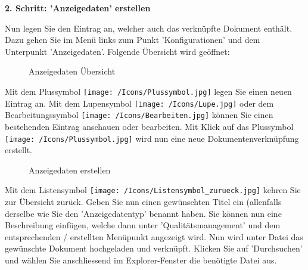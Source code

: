 \vspace{\baselineskip}

\textbf{2. Schritt: 'Anzeigedaten' erstellen}

Nun legen Sie den Eintrag an, welcher auch das verknüpfte Dokument enthält. Dazu gehen Sie im Menü links zum Punkt 'Konfigurationen' und dem Unterpunkt 'Anzeigedaten'. Folgende Übersicht wird geöffnet: 

\begin{figure}[H]
\caption{Anzeigedaten Übersicht}
\end{figure}

Mit dem Plussymbol \texttt{[image: /Icons/Plussymbol.jpg]}  legen Sie einen neuen Eintrag an. Mit dem Lupensymbol \texttt{[image: /Icons/Lupe.jpg]}  oder dem Bearbeitungssymbol \texttt{[image: /Icons/Bearbeiten.jpg]}  können Sie einen bestehenden Eintrag anschauen oder bearbeiten. Mit Klick auf das Plussymbol \texttt{[image: /Icons/Plussymbol.jpg]}  wird nun eine neue Dokumentenverknüpfung erstellt. 

\begin{figure}[H]
\caption{Anzeigedaten erstellen}
\end{figure}

Mit dem Listensymbol \texttt{[image: /Icons/Listensymbol\_zurueck.jpg]}  kehren Sie zur Übersicht zurück. Geben Sie nun einen gewünschten Titel  ein (allenfalls derselbe wie Sie den 'Anzeigedatentyp' benannt haben. Sie können nun eine Beschreibung  einfügen, welche dann unter 'Qualitätsmanagement' und dem entsprechenden / erstellten Menüpunkt angezeigt wird. Nun wird unter Datei  das gewünschte Dokument hochgeladen und verknüpft. Klicken Sie auf 'Durchsuchen' und wählen Sie anschliessend im Explorer-Fenster die benötigte Datei aus.\\

